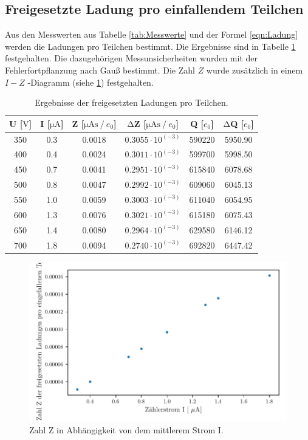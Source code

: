 \subsection{Freigesetzte Ladung pro einfallendem Teilchen}
\label{subsec:LadungProTeilchen}
Aus den Messwerten aus Tabelle \ref{tab:Messwerte} und der Formel \ref{eqn:Ladung} werden die Ladungen pro Teilchen bestimmt.
Die Ergebnisse sind in Tabelle \ref{tab:Ladungen} festgehalten.
Die dazugehörigen Messunsicherheiten wurden mit der Fehlerfortpflanzung nach Gauß bestimmt.
Die Zahl $Z$ wurde zusätzlich in einem $I-Z$ -Diagramm (siehe \ref{fig:I_Z}) festgehalten.

\begin{table}
  \centering
  \caption{Ergebnisse der freigesetzten Ladungen pro Teilchen.}
  \label{tab:Ladungen}
  \begin{tabular}{c c c c c c}
    \toprule
    {U [$\si{\volt}$]} & {I [$\si{\micro\ampere}$]} & {Z [$\si{\micro\ampere\second} \mathbin{/} e_0 $]} & {$\increment$Z [$\si{\micro\ampere\second} \mathbin{/} e_0 $]} & {Q [$e_0$]} & {$\increment$Q [$e_0$]}\\
    \midrule
    350 &0.3 & 0.0018 & $0.3055 \cdot 10^(-3)$ & 590220& 5950.90 \\
    400 &0.4 & 0.0024 & $0.3011 \cdot 10^(-3)$ & 599700& 5998.50 \\
    450 &0.7 & 0.0041 & $0.2951 \cdot 10^(-3)$ & 615840& 6078.68 \\
    500 &0.8 & 0.0047 & $0.2992 \cdot 10^(-3)$ & 609060& 6045.13 \\
    550 &1.0 & 0.0059 & $0.3003 \cdot 10^(-3)$ & 611040& 6054.95 \\
    600 &1.3 & 0.0076 & $0.3021 \cdot 10^(-3)$ & 615180& 6075.43 \\
    650 &1.4 & 0.0080 & $0.2964 \cdot 10^(-3)$ & 629580& 6146.12 \\
    700 &1.8 & 0.0094 & $0.2740 \cdot 10^(-3)$ & 692820& 6447.42 \\
  \end{tabular}
\end{table}

\begin{figure}
  \centering
  \includegraphics[width=\textwidth]{Aufgabe_Bestimmung_des_Zaehlrohrstroms.pdf}
  \caption{Zahl Z in Abhängigkeit von dem mittlerem Strom I.}
  \label{fig:I_Z}
\end{figure}


